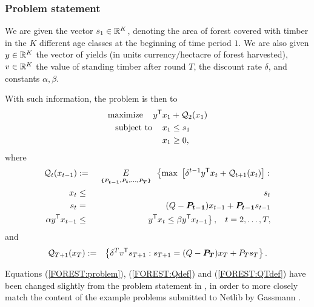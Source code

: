 \subsubsection{Problem statement}

We are given the vector $s_1 \in {\mathbb R}^K$, denoting the area of forest covered with timber in the $K$ different age classes at the beginning of time period $1$.  We are also given $y \in {\mathbb R}^K$ the vector of yields (in units currency$/$hectacre of forest harvested), $v \in {\mathbb R}^K$ the value of standing timber after round $T$, the discount rate $\delta$, and constants $ \alpha, \beta$.


With such information, the problem is then to
\begin{equation}
\label{FOREST:problem}
\begin{split}
\mbox{maximize }\hspace{3mm} y^{\mbox{\scriptsize\sf T}} x_1 &+ \mathcal{Q}_2(x_1)\\
\mbox{subject to }\hspace{3mm}x_1& \leq s_1 \\
		x_1 &\geq 0,
\end{split}
\end{equation}
where
\begin{eqnarray}
\label{FOREST:Qdef}
\mathcal{Q}_t(x_{t-1})&\assign& \expect[\{P_{t-1}, P_{t}, \ldots, P_{T}\}]\left\{\mbox{max }\left[
	\delta^{t-1} y\trp x_{t} + \mathcal{Q}_{t+1}(x_{t})\right]:\right. \nonumber\\ 
x_{t}&\leq& s_{t}\\
s_{t}&=& (Q-\rand{P_{t-1}})x_{t-1} + \rand{P_{t-1}}s_{t-1} \\
 \alpha y\trp x_{t-1}  &\leq&  \left.y\trp x_{t} \leq \beta y\trp x_{t-1}\right\},
	\hspace{3mm} t=2, \ldots,T, 
\end{eqnarray}
and
\begin{eqnarray}
\label{FOREST:QTdef}
\mathcal{Q}_{T+1}(x_T)&:=&\left\{\delta^T v^{\mbox{\scriptsize\sf T}} s_{T+1}:s_{T+1}=(Q-\mathbf{\boldsymbol{P_{T}}})x_{T} + P_{T} s_{T}\right\}.
\end{eqnarray}

Equations (\ref{FOREST:problem}), (\ref{FOREST:Qdef}) and (\ref{FOREST:QTdef}) have been changed slightly from the problem statement in  \cite{gassmann89}, in order to more closely match the content of the example problems submitted to Netlib by Gassmann \cite{gassmannwww}.

